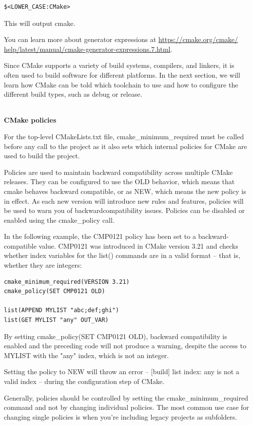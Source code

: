 \begin{lstlisting}[style=styleCMake]
$<LOWER_CASE:CMake>
\end{lstlisting}

This will output cmake. 

You can learn more about generator expressions at \url{https://cmake.org/cmake/
help/latest/manual/cmake-generator-expressions.7.html}.

Since CMake supports a variety of build systems, compilers, and linkers, it is often used to build software for different platforms. In the next section, we will learn how CMake can be told which toolchain to use and how to configure the different build types, such as debug or release.

\hspace*{\fill} \\ %
\noindent
\textbf{CMake policies}

For the top-level CMakeLists.txt file, cmake\_minimum\_required must be called before any call to the project as it also sets which internal policies for CMake are used to build the project.

Policies are used to maintain backward compatibility across multiple CMake releases. They can be configured to use the OLD behavior, which means that cmake behaves backward compatible, or as NEW, which means the new policy is in effect. As each new version will introduce new rules and features, policies will be used to warn you of backwardcompatibility issues. Policies can be disabled or enabled using the cmake\_policy call.

In the following example, the CMP0121 policy has been set to a backward-compatible value. CMP0121 was introduced in CMake version 3.21 and checks whether index variables for the list() commands are in a valid format – that is, whether they are integers:

\begin{lstlisting}[style=styleCMake]
cmake_minimum_required(VERSION 3.21)
cmake_policy(SET CMP0121 OLD)

list(APPEND MYLIST "abc;def;ghi")
list(GET MYLIST "any" OUT_VAR)
\end{lstlisting}

By setting cmake\_policy(SET CMP0121 OLD), backward compatibility is enabled and the preceding code will not produce a warning, despite the access to MYLIST with the "any" index, which is not an integer.

Setting the policy to NEW will throw an error – [build] list index: any is not
a valid index – during the configuration step of CMake.
\
\hspace*{\fill} \\ %
\begin{tcolorbox}[colback=blue!5!white,colframe=blue!75!black,title=Avoid Setting Single Policies Except When You're Including Legacy Projects]
Generally, policies should be controlled by setting the cmake\_minimum\_required command and not by changing individual policies. The most common use case for changing single policies is when you're including legacy projects as subfolders.
\end{tcolorbox}

